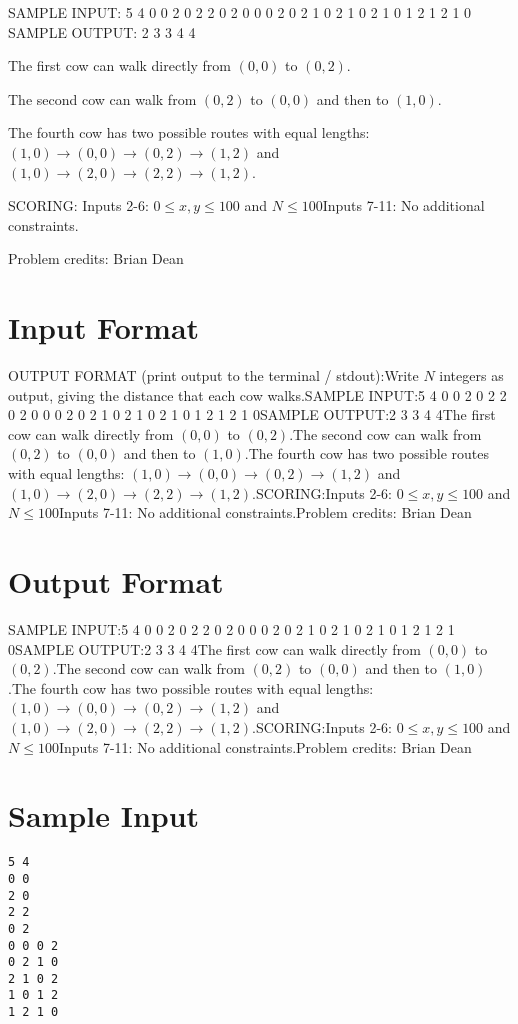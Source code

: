 \documentclass[12pt]{article}
\begin{document}
SAMPLE INPUT:
5 4
0 0
2 0
2 2
0 2
0 0 0 2
0 2 1 0
2 1 0 2
1 0 1 2
1 2 1 0
SAMPLE OUTPUT: 
2
3
3
4
4

The first cow can walk directly from $(0,0)$ to $(0,2)$.

The second cow can walk from $(0,2)$ to $(0,0)$ and then to $(1,0)$.

The fourth cow has two possible routes with equal lengths:
$(1,0)\to (0,0)\to (0,2)\to (1,2)$ and $(1,0)\to (2,0)\to (2,2)\to (1,2)$.

SCORING:
Inputs 2-6: $0\le x,y \le 100$ and $N\le 100$Inputs 7-11: No additional constraints.


Problem credits: Brian Dean



\section*{Input Format}
OUTPUT FORMAT (print output to the terminal / stdout):Write $N$ integers as output, giving the distance that each cow walks.SAMPLE INPUT:5 4
0 0
2 0
2 2
0 2
0 0 0 2
0 2 1 0
2 1 0 2
1 0 1 2
1 2 1 0SAMPLE OUTPUT:2
3
3
4
4The first cow can walk directly from $(0,0)$ to $(0,2)$.The second cow can walk from $(0,2)$ to $(0,0)$ and then to $(1,0)$.The fourth cow has two possible routes with equal lengths:
$(1,0)\to (0,0)\to (0,2)\to (1,2)$ and $(1,0)\to (2,0)\to (2,2)\to (1,2)$.SCORING:Inputs 2-6: $0\le x,y \le 100$ and $N\le 100$Inputs 7-11: No additional constraints.Problem credits: Brian Dean

\section*{Output Format}
SAMPLE INPUT:5 4
0 0
2 0
2 2
0 2
0 0 0 2
0 2 1 0
2 1 0 2
1 0 1 2
1 2 1 0SAMPLE OUTPUT:2
3
3
4
4The first cow can walk directly from $(0,0)$ to $(0,2)$.The second cow can walk from $(0,2)$ to $(0,0)$ and then to $(1,0)$.The fourth cow has two possible routes with equal lengths:
$(1,0)\to (0,0)\to (0,2)\to (1,2)$ and $(1,0)\to (2,0)\to (2,2)\to (1,2)$.SCORING:Inputs 2-6: $0\le x,y \le 100$ and $N\le 100$Inputs 7-11: No additional constraints.Problem credits: Brian Dean

\section*{Sample Input}
\begin{verbatim}
5 4
0 0
2 0
2 2
0 2
0 0 0 2
0 2 1 0
2 1 0 2
1 0 1 2
1 2 1 0
\end{verbatim}
\end{document}
